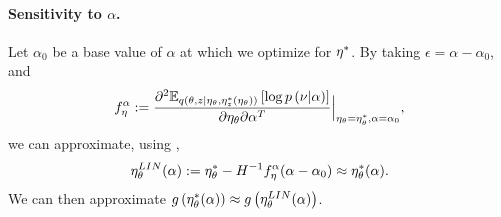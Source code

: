 \paragraph{Sensitivity to $\alpha$.}
%
Let $\alpha_0$ be a base value of $\alpha$ at which we optimize for
$\eta^{*}$. By taking $\epsilon = \alpha - \alpha_0$, and
%
\begin{align*}
f^\alpha_\eta := \frac{\partial^2
    \mathbb{E}_{q\left(\theta, z \vert \eta_\theta, \eta_z^{*}(\eta_\theta)\right)}
        \left[ \log p\left(\nu \vert \alpha \right) \right]}
{ \partial \eta_\theta \partial \alpha^T }
    \Big\rvert_{\eta_\theta = \eta_\theta^{*}, \alpha = \alpha_0},
\end{align*}
%
we can approximate, using ,
%
\begin{align*}
\eta_\theta^{LIN}(\alpha) := \eta_\theta^{*} -
  H^{-1} f^\alpha_\eta (\alpha - \alpha_0) \approx \eta_\theta^{*}(\alpha).
\end{align*}
%
We can then approximate
$g\left(\eta_\theta^{*}(\alpha)\right) \approx g\left(\eta_\theta^{LIN}(\alpha)\right)$.
